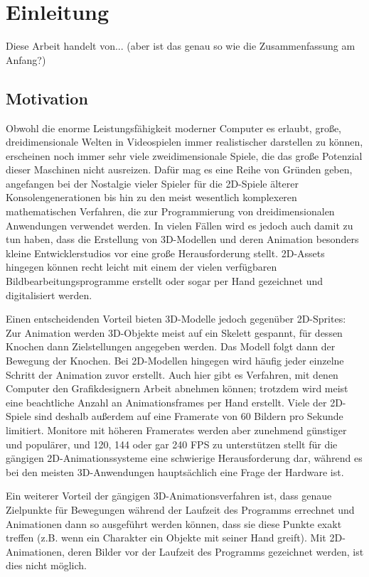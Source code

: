 \chapter{Einleitung}
Diese Arbeit handelt von... (aber ist das genau so wie die Zusammenfassung am Anfang?)

\section{Motivation}
Obwohl die enorme Leistungsfähigkeit moderner Computer es erlaubt, große, dreidimensionale Welten in Videospielen immer realistischer darstellen zu können, erscheinen noch immer sehr viele zweidimensionale Spiele, die das große Potenzial dieser Maschinen nicht ausreizen. Dafür mag es eine Reihe von Gründen geben, angefangen bei der Nostalgie vieler Spieler für die 2D-Spiele älterer Konsolengenerationen bis hin zu den meist wesentlich komplexeren mathematischen Verfahren, die zur Programmierung von dreidimensionalen Anwendungen verwendet werden. In vielen Fällen wird es jedoch auch damit zu tun haben, dass die Erstellung von 3D-Modellen und deren Animation besonders kleine Entwicklerstudios vor eine große Herausforderung stellt. 2D-Assets hingegen können recht leicht mit einem der vielen verfügbaren Bildbearbeitungsprogramme erstellt oder sogar per Hand gezeichnet und digitalisiert werden.

Einen entscheidenden Vorteil bieten 3D-Modelle jedoch gegenüber 2D-Sprites: Zur Animation werden 3D-Objekte meist auf ein Skelett gespannt, für dessen Knochen dann Zielstellungen angegeben werden. Das Modell folgt dann der Bewegung der Knochen. Bei 2D-Modellen hingegen wird häufig jeder einzelne Schritt der Animation zuvor erstellt. Auch hier gibt es Verfahren, mit denen Computer den Grafikdesignern Arbeit abnehmen können; trotzdem wird meist eine beachtliche Anzahl an Animationsframes per Hand erstellt. Viele der 2D-Spiele sind deshalb außerdem auf eine Framerate von 60 Bildern pro Sekunde limitiert. Monitore mit höheren Framerates werden aber zunehmend günstiger und populärer, und 120, 144 oder gar 240 FPS zu unterstützen stellt für die gängigen 2D-Animationssysteme eine schwierige Herausforderung dar, während es bei den meisten 3D-Anwendungen hauptsächlich eine Frage der Hardware ist.

Ein weiterer Vorteil der gängigen 3D-Animationsverfahren ist, dass genaue Zielpunkte für Bewegungen während der Laufzeit des Programms errechnet und Animationen dann so ausgeführt werden können, dass sie diese Punkte exakt treffen (z.B. wenn ein Charakter ein Objekte mit seiner Hand greift). Mit 2D-Animationen, deren Bilder vor der Laufzeit des Programms gezeichnet werden, ist dies nicht möglich.

